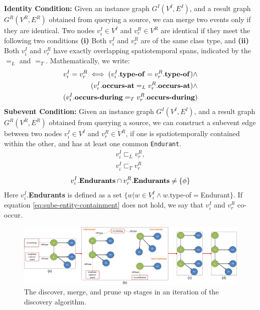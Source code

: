 \textbf{Identity Condition:} Given an instance graph $G^I(V^I, E^I)$, and a result graph $G^R(V^R, E^R)$ obtained from querying a source, we can merge two events only if they are identical. Two nodes $v^I_i \in V^I$ and $v^R_r \in V^R$ are identical if they meet the following two conditions \textbf{(i)} Both $v^I_i$ and $v^R_r$ are of the same class type, and \textbf{(ii)} Both $v^I_i$ and $v^R_r$ have exactly overlapping spatiotemporal spans, indicated by the $=_L$ and $=_T$. Mathematically, we write: 
\begin{equation}
\label{eq:identity}
\begin{aligned}
v^I_i = v^R_r \iff (v^I_i.\text{\textbf{type-of}} = v^R_r.\text{\textbf{type-of}}) \wedge \\ 
(v^I_i.\text{\textbf{occurs-at}} =_L v^R_r.\text{\textbf{occurs-at}}) \wedge \\
(v^I_i.\text{\textbf{occurs-during}} =_T v^R_r.\text{\textbf{occurs-during}})
\end{aligned}
\end{equation}
\textbf{Subevent Condition:} Given an instance graph $G^I(V^I, E^I)$, and a result graph $G^R(V^R, E^R)$ obtained from querying a source, we can construct a subevent edge between two nodes $v^I_i \in V^I$ and $v^R_r \in V^R$, if one is spatiotemporally contained within the other, and has at least one common \texttt{Endurant}.
\begin{equation}
\label{eq:sube-st-containment}
\begin{aligned}
   v^I_i \sqsubset_L v^R_r,\\
   v^I_i \sqsubset_T v^R_r
\end{aligned}
\end{equation}
\begin{equation}
\label{eq:sube-entity-containment}
\begin{aligned}
   v^I_i.\text{\textbf{Endurants}} \cap v^R_r.\text{\textbf{Endurants}} \neq \{\phi\}\\
\end{aligned}
\end{equation}
Here $v^I_i.$\textbf{Endurants} is defined as a set $\{w | w \in V^I_i \wedge w.$type-of$ = $Endurant$\}$. If equation \eqref{eq:sube-entity-containment} does not hold, we say that $v^I_i$ and $v^R_r$ co-occur.

\begin{figure}[h]
\centering
\includegraphics[width=\textwidth]{media/exec/exec-cycle-one-line.png}
\caption{The discover, merge, and prune up stages in an iteration of the discovery algorithm.}
\label{fig:exec-cycle}
\end{figure}

